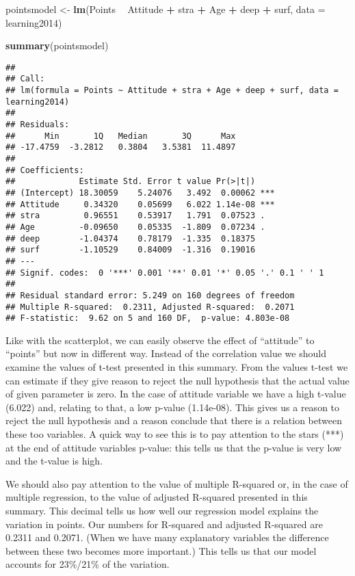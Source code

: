 \documentclass[]{article}
\newenvironment{Shaded}{\begin{snugshade}}{\end{snugshade}}
\newcommand{\KeywordTok}[1]{\textcolor[rgb]{0.13,0.29,0.53}{\textbf{#1}}}
\newcommand{\DataTypeTok}[1]{\textcolor[rgb]{0.13,0.29,0.53}{#1}}
\newcommand{\StringTok}[1]{\textcolor[rgb]{0.31,0.60,0.02}{#1}}
\newcommand{\OperatorTok}[1]{\textcolor[rgb]{0.81,0.36,0.00}{\textbf{#1}}}
\newcommand{\NormalTok}[1]{#1}
\begin{document}
\begin{Shaded}
\begin{Highlighting}[]
\NormalTok{pointsmodel <-}\StringTok{ }\KeywordTok{lm}\NormalTok{(Points }\OperatorTok{~}\StringTok{ }\NormalTok{Attitude }\OperatorTok{+}\StringTok{ }\NormalTok{stra }\OperatorTok{+}\StringTok{ }\NormalTok{Age }\OperatorTok{+}\StringTok{ }\NormalTok{deep }\OperatorTok{+}\StringTok{ }\NormalTok{surf, }\DataTypeTok{data =}\NormalTok{ learning2014)}

\KeywordTok{summary}\NormalTok{(pointsmodel)}
\end{Highlighting}
\end{Shaded}

\begin{verbatim}
## 
## Call:
## lm(formula = Points ~ Attitude + stra + Age + deep + surf, data = learning2014)
## 
## Residuals:
##      Min       1Q   Median       3Q      Max 
## -17.4759  -3.2812   0.3804   3.5381  11.4897 
## 
## Coefficients:
##             Estimate Std. Error t value Pr(>|t|)    
## (Intercept) 18.30059    5.24076   3.492  0.00062 ***
## Attitude     0.34320    0.05699   6.022 1.14e-08 ***
## stra         0.96551    0.53917   1.791  0.07523 .  
## Age         -0.09650    0.05335  -1.809  0.07234 .  
## deep        -1.04374    0.78179  -1.335  0.18375    
## surf        -1.10529    0.84009  -1.316  0.19016    
## ---
## Signif. codes:  0 '***' 0.001 '**' 0.01 '*' 0.05 '.' 0.1 ' ' 1
## 
## Residual standard error: 5.249 on 160 degrees of freedom
## Multiple R-squared:  0.2311, Adjusted R-squared:  0.2071 
## F-statistic:  9.62 on 5 and 160 DF,  p-value: 4.803e-08
\end{verbatim}

Like with the scatterplot, we can easily observe the effect of
``attitude'' to ``points'' but now in different way. Instead of the
correlation value we should examine the values of t-test presented in
this summary. From the values t-test we can estimate if they give reason
to reject the null hypothesis that the actual value of given parameter
is zero. In the case of attitude variable we have a high t-value (6.022)
and, relating to that, a low p-value (1.14e-08). This gives us a reason
to reject the null hypothesis and a reason conclude that there is a
relation between these too variables. A quick way to see this is to pay
attention to the stars (***) at the end of attitude variables p-value:
this tells us that the p-value is very low and the t-value is high.

We should also pay attention to the value of multiple R-squared or, in
the case of multiple regression, to the value of adjusted R-squared
presented in this summary. This decimal tells us how well our regression
model explains the variation in points. Our numbers for R-squared and
adjusted R-squared are 0.2311 and 0.2071. (When we have many explanatory
variables the difference between these two becomes more important.) This
tells us that our model accounts for 23\%/21\% of the variation.
\end{document}
